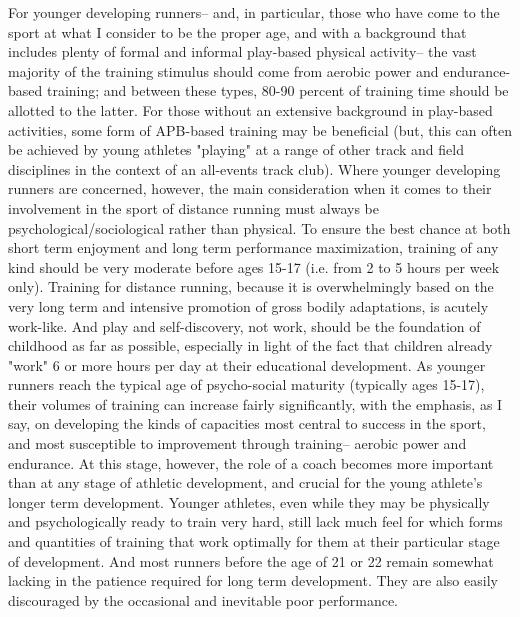 For younger developing runners-- and, in particular, those who have come to the sport at what I consider to be the proper age, and with a background that includes plenty of formal and informal play-based physical activity-- the vast majority of the training stimulus should come from aerobic power and endurance-based training; and between these types, 80-90 percent of training time should be allotted to the latter. For those without an extensive background in play-based activities, some form of APB-based training may be beneficial (but, this can often be achieved by young athletes "playing" at a range of other track and field disciplines in the context of an all-events track club). Where younger developing runners are concerned, however, the main consideration when it comes to their involvement in the sport of distance running must always be psychological/sociological rather than physical. To ensure the best chance at both short term enjoyment and long term performance maximization, training of any kind should be very moderate before ages 15-17 (i.e. from 2 to 5 hours per week only). Training for distance running, because it is overwhelmingly based on the very long term and intensive promotion of gross bodily adaptations, is acutely work-like. And play and self-discovery, not work, should be the foundation of childhood as far as possible, especially in light of the fact that children already "work" 6 or more hours per day at their educational development. As younger runners reach the typical age of psycho-social maturity (typically ages 15-17), their volumes of training can increase fairly significantly, with the emphasis, as I say, on developing the kinds of capacities most central to success in the sport, and most susceptible to improvement through training-- aerobic power and endurance. At this stage, however, the role of a coach becomes more important than at any stage of athletic development, and crucial for the young athlete's longer term development. Younger athletes, even while they may be physically and psychologically ready to train very hard, still lack much feel for which forms and quantities of training that work optimally for them at their particular stage of development. And most runners before the age of 21 or 22 remain somewhat lacking in the patience required for long term development. They are also easily discouraged by the occasional and inevitable poor performance.

